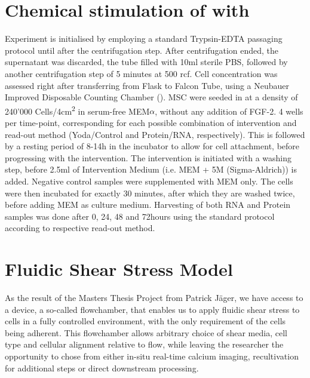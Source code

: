 \section{Chemical stimulation of \Piezo{} with \Yoda}
Experiment is initialised by employing a standard Trypsin-EDTA passaging protocol until after the centrifugation step. After centrifugation ended, the supernatant was discarded, the tube filled with 10ml sterile PBS, followed by another centrifugation step of 5 minutes at 500 rcf. Cell concentration was assessed right after transferring from Flask to Falcon Tube, using a Neubauer Improved Disposable Counting Chamber (). 
MSC were seeded in  at a density of 240'000 Cells/4cm\textsuperscript{2} in serum-free MEM$\alpha$, without any addition of FGF-2. 4 wells per time-point, corresponding for each possible combination of  intervention and read-out method (Yoda/Control and Protein/RNA, respectively). This is followed by a resting period of 8-14h in the incubator to allow for cell attachment, before progressing with the intervention.
The intervention is initiated with a washing step, before 2.5ml of Intervention Medium (i.e. MEM\textalpha{} + 5\textmu{}M \Yoda (Sigma-Aldrich)) is added. Negative control samples were supplemented with MEM\textalpha{} only. The cells were then incubated for exactly 30 minutes, after which they are washed twice, before adding MEM\textalpha{} as culture medium. Harvesting of both RNA and Protein samples was done after 0, 24, 48 and 72hours using the standard protocol according to respective read-out method.\\ 

\section{Fluidic Shear Stress Model}
As the result of the Masters Thesis Project from Patrick Jäger, we have access to a device, a so-called flowchamber, that enables us to apply fluidic shear stress to cells in a fully controlled environment, with the only requirement of the cells being adherent. This flowchamber allows arbitrary choice of shear media, cell type and cellular alignment relative to flow, while leaving the researcher the opportunity to chose from either in-situ real-time calcium imaging, recultivation for additional steps or direct downstream processing.


